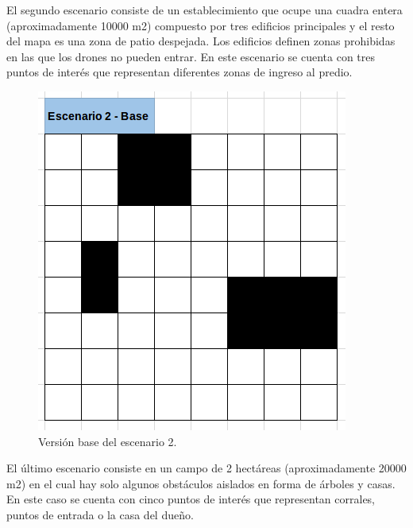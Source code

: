El segundo escenario consiste de un establecimiento que ocupe una cuadra entera (aproximadamente 10000 m2) compuesto por tres edificios principales y el resto del mapa es una zona de patio despejada. Los edificios definen zonas prohibidas en las que los drones no pueden entrar. En este escenario se cuenta con tres puntos de interés que representan diferentes zonas de ingreso al predio.


\begin{figure}[h!]
	\label{fig:comp}
	\includegraphics[width=.8\textwidth]{imagenes/chap6/image2}
	\caption{Versión base del escenario 2.}
\end{figure}

El último escenario consiste en un campo de 2 hectáreas (aproximadamente 20000 m2) en el cual hay solo algunos obstáculos aislados en forma de árboles y casas. En este caso se cuenta con cinco puntos de interés que representan corrales, puntos de entrada o la casa del dueño.


